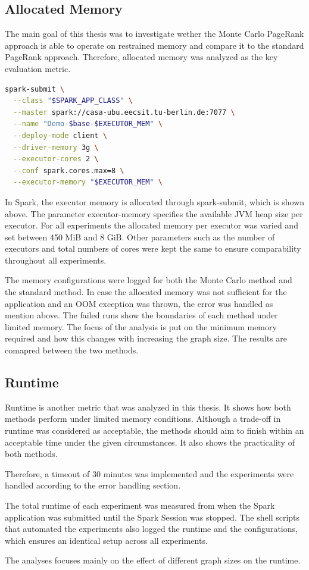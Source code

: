 \subsection{Allocated Memory}
The main goal of this thesis was to investigate wether the Monte Carlo PageRank approach is able to operate on restrained memory and compare it to the standard PageRank approach. Therefore, allocated memory was analyzed as the key evaluation metric. 
\vspace{0.5em}
\begin{lstlisting}[language=bash, caption={Spark-submit command}]
spark-submit \
  --class "$SPARK_APP_CLASS" \
  --master spark://casa-ubu.eecsit.tu-berlin.de:7077 \
  --name "Demo-$base-$EXECUTOR_MEM" \
  --deploy-mode client \
  --driver-memory 3g \
  --executor-cores 2 \
  --conf spark.cores.max=8 \
  --executor-memory "$EXECUTOR_MEM" \
\end{lstlisting}
\vspace{0.5em}
In Spark, the executor memory is allocated through spark-submit, which is shown above. The parameter executor-memory specifies the available JVM heap size per executor. For all experiments the allocated memory per executor was varied and set between 450 MiB and 8 GiB. Other parameters such as the number of executors and total numbers of cores were kept the same to ensure comparability throughout all experiments.\par
The memory configurations were logged for both the Monte Carlo method and the standard method. In case the allocated memory was not sufficient for the application and an OOM exception was thrown, the error was handled as mention above. The failed runs show the boundaries of each method under limited memory. The focus of the analysis is put on the minimum memory required and how this changes with increasing the graph size. The results are comapred between the two methods.



\subsection{Runtime}
Runtime is another metric that was analyzed in this thesis. It shows how both methods perform under limited memory conditions. Although a trade-off in runtime was considered as acceptable, the methods should aim to finish within an acceptable time under the given circumstances. It also shows the practicality of both methods.\par
Therefore, a timeout of 30 minutes was implemented and the experiments were handled according to the error handling section.\par 
The total runtime of each experiment was measured from when the Spark application was submitted until the Spark Session was stopped. The shell scripts that automated the experiments also logged the runtime and the configurations, which ensures an identical setup across all experiments.\par
The analyses focuses mainly on the effect of different graph sizes on the runtime. 


